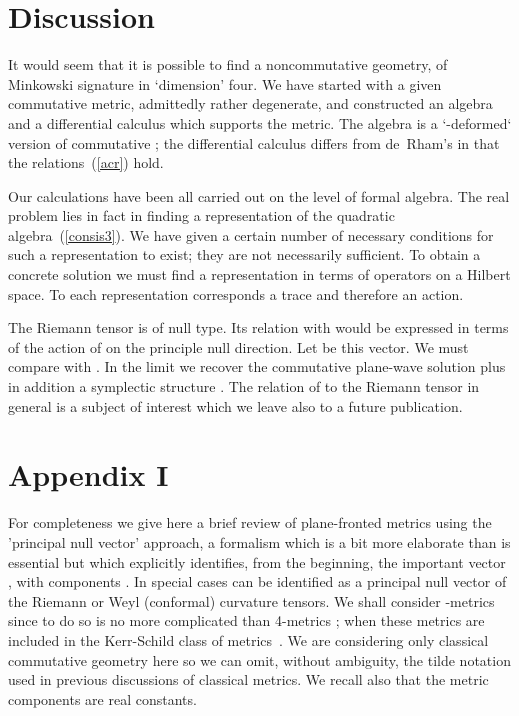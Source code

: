 \documentclass[12pt,a4paper]{article}
\newcounter{eg}
\def\t#1{\tilde #1}
\def\b#1{{\mathbb #1}}
\def\kbar{{\mathchar'26\mkern-9muk}}
\providecommand{\initiate}{\setcounter{equation}{0}}
\begin{document}
\initiate
\section{Discussion}

It would seem that it is possible to find a noncommutative geometry,
of Minkowski signature in `dimension' four. We have
started with a given commutative metric, admittedly rather degenerate,
and constructed an algebra and a differential calculus which supports
the metric. The algebra is a `\coordHE{}-deformed` version of commutative
\myHighlight{$\b{R}^4$}\coordHE{}; the differential calculus differs from de~Rham's in that the
relations~(\ref{acr}) hold.

Our calculations have been all carried out on the level of formal
algebra. The real problem lies in fact in finding a representation of
the quadratic algebra~(\ref{consis3}). We have given a certain number
of necessary conditions for such a representation to exist; they are
not necessarily sufficient.  To obtain a concrete solution we must
find a representation in terms of operators on a Hilbert space.  To
each representation corresponds a trace and therefore an action.

The Riemann tensor is of null type. Its relation with \coordHE{}
would be expressed in terms of the action of \coordHE{} on the
principle null direction. Let \coordHE{} be this vector. We must compare
\coordHE{} with \coordHE{}.  In the limit \myHighlight{$\kbar \to 0$}\coordHE{} we
recover the commutative plane-wave solution plus in addition a
symplectic structure \coordHE{}.  The relation of \coordHE{} to the Riemann
tensor in general is a subject of interest which we leave also to a
future publication.


\appendix

\initiate
\section*{Appendix I}
\setcounter{section}{1}

\renewcommand{\thesection}{\Roman{section}}

For completeness we give here a brief review of plane-fronted metrics
using the 'principal null vector' approach, a formalism which is a bit
more elaborate than is essential but which explicitly identifies, from
the beginning, the important vector \myHighlight{$k = \t{e_+}$}\coordHE{}, with components
\coordHE{}. In special cases \coordHE{} can be identified as a principal
null vector of the Riemann or Weyl (conformal) curvature tensors. We
shall consider \coordHE{}-metrics since to do so is no more complicated than
4-metrics ; when \coordHE{} these metrics are included in the Kerr-Schild
class of metrics~\cite{KraSteMacHer80}.  We are considering only classical
commutative geometry here so we can omit, without ambiguity, the tilde
notation used in previous discussions of classical metrics. We recall
also that the metric components \coordHE{} are real constants.
\end{document}
